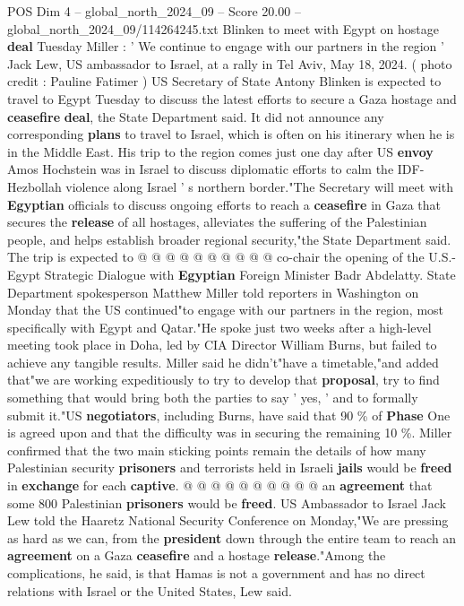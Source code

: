 \begin{textsample}{POS Dim 4 – global\_north\_2024\_09 – Score 20.00 – global\_north\_2024\_09/114264245.txt}  \label{ex:f4_pos_314}
Blinken to meet with Egypt on hostage \textbf{deal} Tuesday Miller : ' We continue to engage with our partners in the region ' Jack Lew, US ambassador to Israel, at a rally in Tel Aviv, May 18, 2024. ( photo credit : Pauline Fatimer ) US Secretary of State Antony Blinken is expected to travel to Egypt Tuesday to discuss the latest efforts to secure a Gaza hostage and \textbf{ceasefire} \textbf{deal}, the State Department said.
It did not announce any corresponding \textbf{plans} to travel to Israel, which is often on his itinerary when he is in the Middle East.
His trip to the region comes just one day after US \textbf{envoy} Amos Hochstein was in Israel to discuss diplomatic efforts to calm the IDF-Hezbollah violence along Israel ' s northern border."The Secretary will meet with \textbf{Egyptian} officials to discuss ongoing efforts to reach a \textbf{ceasefire} in Gaza that secures the \textbf{release} of all hostages, alleviates the suffering of the Palestinian people, and helps establish broader regional security,"the State Department said.
The trip is expected to @ @ @ @ @ @ @ @ @ @ co-chair the opening of the U.S.-Egypt Strategic Dialogue with \textbf{Egyptian} Foreign Minister Badr Abdelatty.
State Department spokesperson Matthew Miller told reporters in Washington on Monday that the US continued"to engage with our partners in the region, most specifically with Egypt and Qatar."He spoke just two weeks after a high-level meeting took place in Doha, led by CIA Director William Burns, but failed to achieve any tangible results.
Miller said he didn't"have a timetable,"and added that"we are working expeditiously to try to develop that \textbf{proposal}, try to find something that would bring both the parties to say ' yes, ' and to formally submit it."US \textbf{negotiators}, including Burns, have said that 90 \% of \textbf{Phase} One is agreed upon and that the difficulty was in securing the remaining 10 \%.
Miller confirmed that the two main sticking points remain the details of how many Palestinian security \textbf{prisoners} and terrorists held in Israeli \textbf{jails} would be \textbf{freed} in \textbf{exchange} for each \textbf{captive}. @ @ @ @ @ @ @ @ @ @ an \textbf{agreement} that some 800 Palestinian \textbf{prisoners} would be \textbf{freed}.
US Ambassador to Israel Jack Lew told the Haaretz National Security Conference on Monday,"We are pressing as hard as we can, from the \textbf{president} down through the entire team to reach an \textbf{agreement} on a Gaza \textbf{ceasefire} and a hostage \textbf{release}."Among the complications, he said, is that Hamas is not a government and has no direct relations with Israel or the United States, Lew said.

\end{textsample}

